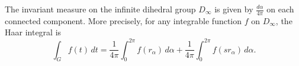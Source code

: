 The invariant measure on the infinite dihedral group $D_{\infty}$ is given by $\frac{d\alpha}{4\pi}$ on each connected component. More precisely, for any integrable function $f$ on $D_{\infty}$, the Haar integral is
$$
\int_{G} f(t)\,dt = \frac{1}{4\pi} \int_{0}^{2\pi} f(r_{\alpha})\,d\alpha + \frac{1}{4\pi} \int_{0}^{2\pi} f(s r_{\alpha})\,d\alpha.
$$
